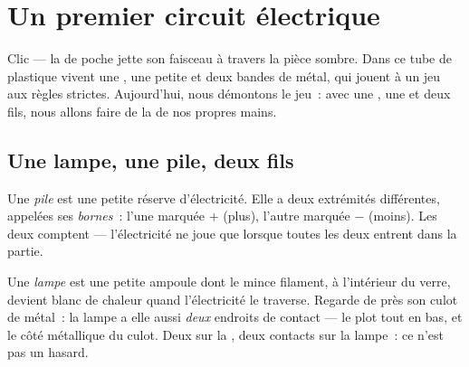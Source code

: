 \chapter{Un premier circuit électrique}\label{ch:g3:first-electric-circuit}

Clic --- la  de poche jette son faisceau à travers la pièce
sombre. Dans ce tube de plastique vivent une , une petite 
et deux bandes de métal, qui jouent à un jeu aux règles strictes.
Aujourd'hui, nous démontons le jeu~: avec une , une  et deux
fils, nous allons faire de la  de nos propres mains.

\section{Une lampe, une pile, deux fils}

\begin{definition}[La pile]\label{def:g3:first-electric-circuit:battery}
Une \emph{pile} est une petite réserve d'électricité.
Elle a deux extrémités différentes, appelées ses
\emph{bornes}~: l'une marquée $+$ (plus), l'autre
marquée $-$ (moins). Les deux comptent --- l'électricité ne joue que
lorsque toutes les deux entrent dans la partie.
\end{definition}

\begin{definition}[La lampe]\label{def:g3:first-electric-circuit:bulb}
Une \emph{lampe} est une petite ampoule dont le mince
filament, à l'intérieur du verre, devient blanc de chaleur quand
l'électricité le traverse. Regarde de près son culot de métal~: la
lampe a elle aussi \emph{deux} endroits de contact --- le plot tout
en bas, et le côté métallique du culot. Deux  sur la , deux
contacts sur la lampe~: ce n'est pas un hasard.
\end{definition}

